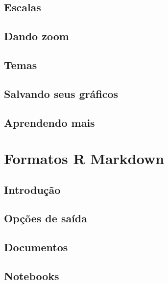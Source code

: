 \documentclass[
]{latex/krantz}
\theoremstyle{definition}
\theoremstyle{definition}
\theoremstyle{definition}
\theoremstyle{definition}
\theoremstyle{remark}
\begin{document}
\hypertarget{escalas}{%
\section{Escalas}\label{escalas}}

\hypertarget{dando-zoom}{%
\section{Dando zoom}\label{dando-zoom}}

\hypertarget{temas}{%
\section{Temas}\label{temas}}

\hypertarget{salvando-seus-gruxe1ficos}{%
\section{Salvando seus gráficos}\label{salvando-seus-gruxe1ficos}}

\hypertarget{aprendendo-mais-2}{%
\section{Aprendendo mais}\label{aprendendo-mais-2}}

\hypertarget{formatos-r-markdown}{%
\chapter{Formatos R Markdown}\label{formatos-r-markdown}}

\hypertarget{introduuxe7uxe3o-19}{%
\section{Introdução}\label{introduuxe7uxe3o-19}}

\hypertarget{opuxe7uxf5es-de-sauxedda}{%
\section{Opções de saída}\label{opuxe7uxf5es-de-sauxedda}}

\hypertarget{documentos}{%
\section{Documentos}\label{documentos}}

\hypertarget{notebooks}{%
\section{Notebooks}\label{notebooks}}
\end{document}
